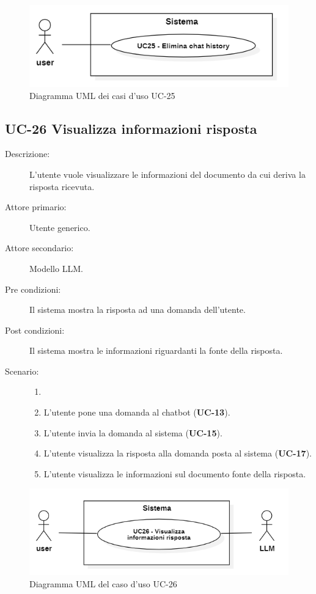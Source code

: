 \begin{figure}[H]
    \centering
    \includegraphics[width=0.9\linewidth]{UC25.png} %
    \caption{Diagramma UML dei casi d'uso UC-25}
    \label{fig:UC30-31}
\end{figure}

\subsection{UC-26 Visualizza informazioni risposta}
\begin{description}
    \item[Descrizione:] L'utente vuole visualizzare le informazioni del documento da cui deriva la risposta ricevuta.
    \item[Attore primario:] Utente generico.
    \item[Attore secondario:] Modello LLM.
    \item[Pre condizioni:] Il sistema mostra la risposta ad una domanda dell'utente.
    \item[Post condizioni:] Il sistema mostra le informazioni riguardanti la fonte della risposta.
    \item[Scenario:]
    \begin{enumerate}
        \item[]
        \item L’utente pone una domanda al chatbot (\textbf{UC-13}).
        \item L'utente invia la domanda al sistema (\textbf{UC-15}).
        \item L'utente visualizza la risposta alla domanda posta al sistema (\textbf{UC-17}).
        \item L'utente visualizza le informazioni sul documento fonte della risposta.
    \end{enumerate}
\end{description}

\begin{figure}[H]
    \centering
    \includegraphics[width=0.9\linewidth]{UC26.png}  %
    \caption{Diagramma UML del caso d'uso UC-26}
    \label{fig:UC32}
\end{figure}

